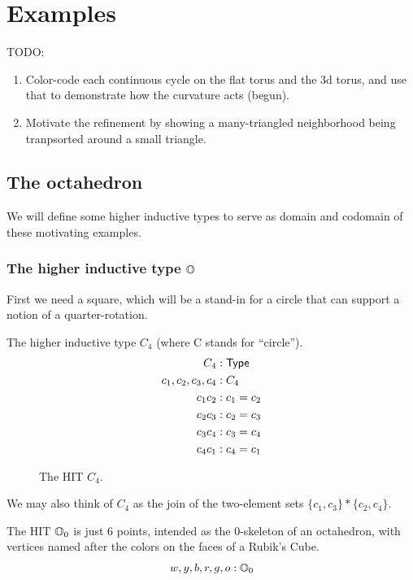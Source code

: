 \section{Examples}

TODO:
\begin{enumerate}
\item Color-code each continuous cycle on the flat torus and the 3d torus, and use that to demonstrate how the curvature acts (begun).
\item Motivate the refinement by showing a many-triangled neighborhood being tranpsorted around a small triangle.
\end{enumerate}
\subsection{The octahedron}

We will define some higher inductive types to serve as domain and codomain of these motivating examples.

\subsubsection{The higher inductive type \( \mathbb{O} \)}

First we need a square, which will be a stand-in for a circle that can support a notion of a quarter-rotation. 

\begin{mydef}
The higher inductive type \( C_4 \) (where C stands for ``circle'').
\begin{align*}
C_4 &: \mathsf{Type} \\
c_1, c_2, c_3, c_4 &: C_4 \\
c_1c_2 &: c_1 = c_2 \\
c_2c_3 &: c_2 = c_3 \\
c_3c_4 &: c_3 = c_4 \\
c_4c_1 &: c_4 = c_1 \\
\end{align*}
\end{mydef}

\begin{figure}[h]
\centering

\caption{The HIT \( C_4 \).}
\end{figure}

We may also think of \( C_4 \) as the join of the two-element sets \( \{c_1, c_3\}* \{c_2, c_4\} \).

\begin{mydef}
The HIT \( \mathbb{O}_0 \) is just 6 points, intended as the 0-skeleton of an octahedron, with vertices named after the colors on the faces of a Rubik's Cube.
\[ w, y, b, r, g, o : \mathbb{O}_0 \]
\end{mydef}

